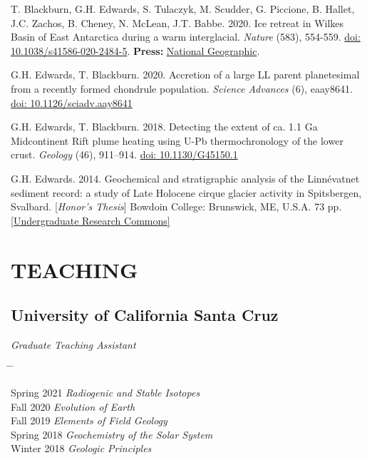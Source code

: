\documentclass[10pt]{article}
\begin{document}
\begin{etaremune} [itemsep=4pt, leftmargin=3ex]
  \item T. Blackburn, G.H. Edwards, S. Tulaczyk, M. Scudder, G. Piccione, B. Hallet, J.C. Zachos, B. Cheney, N. McLean, J.T. Babbe. 2020. Ice retreat in Wilkes Basin of East Antarctica during a warm interglacial. \textit{Nature} (583), 554-559. \href{https://doi.org/10.1038/s41586-020-2484-5}{doi: 10.1038/s41586-020-2484-5}. \textbf{Press:} \href{https://www.nationalgeographic.com/science/2020/07/east-antarctic-ice-sheet-more-vulnerable-to-melting-than-thought/}{National Geographic}.
  \item G.H. Edwards, T. Blackburn. 2020. Accretion of a large LL parent planetesimal from a recently formed chondrule population. \textit{Science Advances} (6), eaay8641. \href{https://advances.sciencemag.org/content/6/16/eaay8641}{doi: 10.1126/sciadv.aay8641}
  \item G.H. Edwards, T. Blackburn. 2018. Detecting the extent of ca. 1.1 Ga Midcontinent Rift plume heating using U-Pb thermochronology of the lower crust. \textit{Geology} (46), 911–914. \href{https://doi.org/10.1130/G45150.1}{doi: 10.1130/G45150.1}
  \item G.H. Edwards. 2014. Geochemical and stratigraphic analysis of the Linnévatnet sediment record: a study of Late Holocene cirque glacier activity in Spitsbergen, Svalbard. [\textit{Honor’s Thesis}] Bowdoin College: Brunswick, ME, U.S.A. 73 pp. \href{https://digitalcommons.bowdoin.edu/honorsprojects/12/}{[Undergraduate Research Commons]}
\end{etaremune}


\section*{TEACHING}

\subsection*{\textbf{University of California Santa Cruz}}
\textit{Graduate Teaching Assistant}
\begin{tabbing} \hspace{10pt} \= \hspace{2.5cm} \=  \kill

\> Spring 2021 \> \textit{Radiogenic and Stable Isotopes}\\
\> Fall 2020 \> \textit{Evolution of Earth}\\
\> Fall 2019 \> \textit{Elements of Field Geology}\\
\> Spring 2018 \>  \textit{Geochemistry of the Solar System}\\
\> Winter 2018 \> \textit{Geologic Principles}

\end{tabbing}
\end{document}
